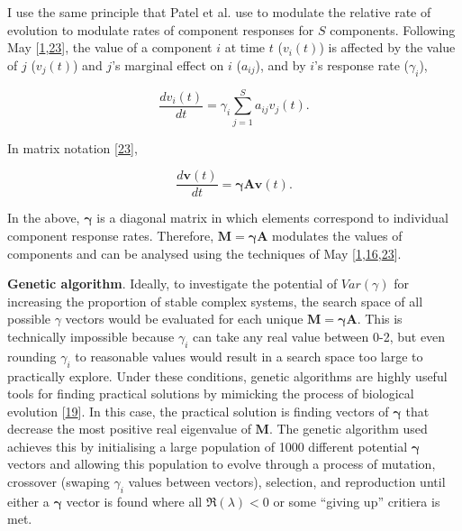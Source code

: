 \documentclass[]{article}
\begin{document}
I use the same principle that Patel et al. use to modulate the relative
rate of evolution to modulate rates of component responses for \(S\)
components. Following May
{[}\protect\hyperlink{ref-May1972}{1},\protect\hyperlink{ref-May1973}{23}{]},
the value of a component \(i\) at time \(t\) (\(v_{i}(t)\)) is affected
by the value of \(j\) (\(v_{j}(t)\)) and \(j\)'s marginal effect on
\(i\) (\(a_{ij}\)), and by \(i\)'s response rate (\(\gamma_{i}\)),

\[\frac{dv_{i}(t)}{dt} = \gamma_{i} \sum_{j=1}^{S}a_{ij}v_{j}(t).\]

In matrix notation {[}\protect\hyperlink{ref-May1973}{23}{]},

\[\frac{d\mathbf{v}(t)}{dt} = \mathbf{\gamma} \mathbf{A}\mathbf{v}(t).\]

In the above, \(\mathbf{\gamma}\) is a diagonal matrix in which elements
correspond to individual component response rates. Therefore,
\(\mathbf{M} =\mathbf{\gamma} \mathbf{A}\) modulates the values of
components and can be analysed using the techniques of May
{[}\protect\hyperlink{ref-May1972}{1},\protect\hyperlink{ref-Ahmadian2015}{16},\protect\hyperlink{ref-May1973}{23}{]}.

\textbf{Genetic algorithm}. Ideally, to investigate the potential of
\(Var(\gamma)\) for increasing the proportion of stable complex systems,
the search space of all possible \(\gamma\) vectors would be evaluated
for each unique \(\mathbf{M = \gamma A}\). This is technically
impossible because \(\gamma_{i}\) can take any real value between 0-2,
but even rounding \(\gamma_{i}\) to reasonable values would result in a
search space too large to practically explore. Under these conditions,
genetic algorithms are highly useful tools for finding practical
solutions by mimicking the process of biological evolution
{[}\protect\hyperlink{ref-Hamblin2013}{19}{]}. In this case, the
practical solution is finding vectors of \(\mathbf{\gamma}\) that
decrease the most positive real eigenvalue of \(\mathbf{M}\). The
genetic algorithm used achieves this by initialising a large population
of 1000 different potential \(\mathbf{\gamma}\) vectors and allowing
this population to evolve through a process of mutation, crossover
(swaping \(\gamma_{i}\) values between vectors), selection, and
reproduction until either a \(\mathbf{\gamma}\) vector is found where
all \(\Re(\lambda) < 0\) or some ``giving up'' critiera is met.
\end{document}
